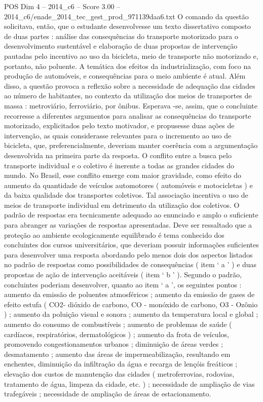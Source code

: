 \begin{textsample}{POS Dim 4 – 2014\_c6 – Score 3.00 – 2014\_c6/enade\_2014\_tec\_gest\_prod\_971139daa6.txt}
O comando da questão solicitava, então, que o estudante desenvolvesse um texto dissertativo composto de duas partes : análise das consequências do transporte motorizado para o desenvolvimento sustentável e elaboração de duas propostas de intervenção pautadas pelo incentivo ao uso da bicicleta, meio de transporte não motorizado e, portanto, não poluente.
A temática dos efeitos da industrialização, com foco na produção de automóveis, e consequências para o meio ambiente é atual.
Além disso, a questão provoca a reflexão sobre a necessidade de adequação das cidades ao número de habitantes, no contexto da utilização dos meios de transportes de massa : metroviário, ferroviário, por ônibus.
Esperava -se, assim, que o concluinte recorresse a diferentes argumentos para analisar as consequências do transporte motorizado, explicitados pelo texto motivador, e propusesse duas ações de intervenção, as quais considerasse relevantes para o incremento ao uso de bicicleta, que, preferencialmente, deveriam manter coerência com a argumentação desenvolvida na primeira parte da resposta.
O conflito entre a busca pelo transporte individual e o coletivo é inerente a todas as grandes cidades do mundo.
No Brasil, esse conflito emerge com maior gravidade, como efeito do aumento da quantidade de veículos automotores ( automóveis e motocicletas ) e da baixa qualidade dos transportes coletivos.
Tal associação incentiva o uso de meios de transporte individual em detrimento da utilização dos coletivos.
O padrão de respostas era tecnicamente adequado ao enunciado e amplo o suficiente para abranger as variações de respostas apresentadas.
Deve ser ressaltado que a proteção ao ambiente ecologicamente equilibrado é tema conhecido dos concluintes dos cursos universitários, que deveriam possuir informações suficientes para desenvolver uma resposta abordando pelo menos dois dos aspectos listados no padrão de respostas como possibilidades de consequências ( item ‘ a ’ ) e duas propostas de ação de intervenção aceitáveis ( item ‘ b ’ ).
Segundo o padrão, concluintes poderiam desenvolver, quanto ao item ‘ a ’, os seguintes pontos : aumento da emissão de poluentes atmosféricos ; aumento da emissão de gases de efeito estufa ( CO2- dióxido de carbono, CO - monóxido de carbono, O3 - Ozônio ) ; aumento da poluição visual e sonora ; aumento da temperatura local e global ; aumento do consumo de combustíveis ; aumento de problemas de saúde ( cardíacos, respiratórios, dermatológicos ) ; aumento da frota de veículos, promovendo congestionamentos urbanos ; diminuição de áreas verdes ; desmatamento ; aumento das áreas de impermeabilização, resultando em enchentes, diminuição da infiltração da água e recarga de lençóis freáticos ; elevação dos custos de manutenção das cidades ( metroferrovias, rodovias, tratamento de água, limpeza da cidade, etc. ) ; necessidade de ampliação de vias trafegáveis ; necessidade de ampliação de áreas de estacionamento.

\end{textsample}

